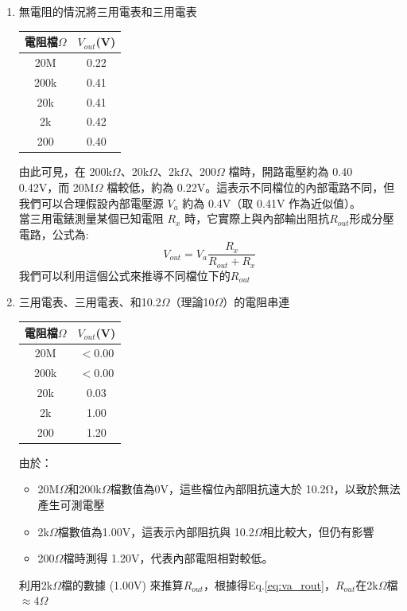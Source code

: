 \documentclass[12pt,a4paper]{article}
\begin{document}
\begin{CJK}{UTF8}{bkai}
\begin{enumerate}
    \item 無電阻的情況將三用電表和三用電表\\
    \begin{center}
    \begin{tabular}{c|c}
    \hline
    電阻檔$\Omega$    &   $V_{out}$(V)\\
    \hline
    \hline
    20M &   0.22\\\hline
    200k    &   0.41\\\hline
    20k &   0.41\\\hline
    2k  &   0.42\\\hline
    200 &   0.40\\\hline
    \end{tabular}
    \end{center}
    由此可見，在 200k$\Omega$、20k$\Omega$、2k$\Omega$、200$\Omega$ 檔時，開路電壓約為 0.40 ~ 0.42V，而 20M$\Omega$ 檔較低，約為 0.22V。這表示不同檔位的內部電路不同，但我們可以合理假設內部電壓源 $V_{a}$ 約為 0.4V（取 0.41V 作為近似值）。\\
    當三用電錶測量某個已知電阻  $R_x$  時，它實際上與內部輸出阻抗$R_{out}$形成分壓電路，公式為:
    \begin{equation}
    \label{eq:va_rout}
        V_{out} = V_{a} \frac{R_{x}}{R_{out}+R_{x}}
    \end{equation}
    我們可以利用這個公式來推導不同檔位下的$R_{out}$
    \clearpage
    \item 三用電表、三用電表、和10.2$\Omega$（理論10$\Omega$）的電阻串連\\
    \begin{center}
    \begin{tabular}{c|c}
    \hline
    電阻檔$\Omega$    &   $V_{out}$(V)\\
    \hline
    \hline
    20M &   $<$0.00\\\hline
    200k    &   $<$0.00\\\hline
    20k &   0.03\\\hline
    2k  &   1.00\\\hline
    200 &   1.20\\\hline
    \end{tabular}
    \end{center}
    由於：
    \begin{itemize}
        \item 20M$\Omega$和200k$\Omega$檔數值為0V，這些檔位內部阻抗遠大於 10.2Ω，以致於無法產生可測電壓
        \item 2k$\Omega$檔數值為1.00V，這表示內部阻抗與 10.2$\Omega$相比較大，但仍有影響
        \item 200$\Omega$檔時測得 1.20V，代表內部電阻相對較低。
    \end{itemize}
    利用2k$\Omega$檔的數據 (1.00V) 來推算$R_{out}$，根據得Eq.\ref{eq:va_rout}，$R_{out}$在2k$\Omega$檔$\approx4\Omega$
    

\end{enumerate}
\end{CJK}
\end{document}
